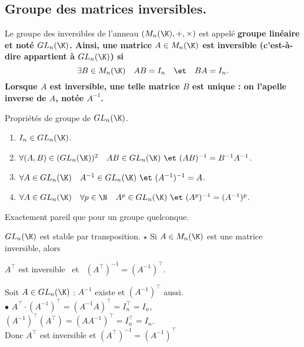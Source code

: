 \documentclass[11pt]{article}
\begin{document}
\subsection{Groupe des matrices inversibles.}

\begin{defi}{}{}
    Le groupe des inversibles de l'anneau $(M_n(\K),+,\times)$ est appelé \bf{groupe linéaire} et noté $GL_n(\K)$.\n
    Ainsi, une matrice $A\in M_n(\K)$ est \bf{inversible} (c'est-à-dire appartient à $GL_n(\K)$) si
    \begin{equation*}
        \exists B\in M_n(\K) \quad AB=I_n \quad\et\quad BA=I_n.
    \end{equation*}
    Lorsque $A$ est inversible, une telle matrice $B$ est unique : on l'apelle \bf{inverse} de $A$, notée $A^{-1}$.
\end{defi}

\begin{prop}{Propriétés de groupe de $GL_n(\K)$.}{}
    \begin{enumerate}
        \item $I_n\in GL_n(\K)$.
        \item $\forall (A,B)\in(GL_n(\K))^2 \quad AB\in GL_n(\K) ~\et~ (AB)^{-1}=B^{-1}A^{-1}$.
        \item $\forall A\in GL_n(\K)\quad A^{-1}\in GL_n(\K) ~\et~ (A^{-1})^{-1}=A$.
        \item $\forall A \in GL_n(\K)\quad\forall p\in \N\quad A^p\in GL_n(\K) ~\et~ (A^p)^{-1}=(A^{-1})^p$.
    \end{enumerate}
    \tcblower
    Exactement pareil que pour un groupe quelconque.
\end{prop}

\begin{prop}{$GL_n(\K)$ est stable par transposition. $\star$}{}
    Si $A\in M_n(\K)$ est une matrice inversible, alors
    \begin{center}
        $A^\top$ est inversible ~et~ $(A^\top)^{-1}=(A^{-1})^\top$.
    \end{center}
    \tcblower
    Soit $A\in GL_n(\K)$ : $A^{-1}$ existe et $(A^{-1})^\top$ aussi.\\
    $\bullet$ $A^\top\cdot(A^{-1})^\top=(A^{-1}A)^\top=I_n^\top=I_n$, ~ $(A^{-1})^\top(A^\top)=(AA^{-1})^\top=I_n^\top=I_n$.\\
    Donc $A^\top$ est inversible et $(A^\top)^{-1}=(A^{-1})^\top$
\end{prop}
\end{document}
